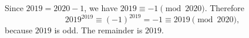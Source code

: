 Since $2019=2020-1$, we have $2019\equiv-1\pmod{2020}$. Therefore
\[
2019^{2019}\equiv(-1)^{2019}=-1\equiv2019\pmod{2020},
\]
because $2019$ is odd. The remainder is $\boxed{2019}$.
